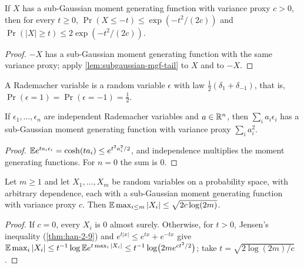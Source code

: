 \begin{lemma}
  \label{lem:subgaussian-mgf-two-sided}
  If $X$ has a sub-Gaussian moment generating function with variance proxy $c>0$, then for every $t\ge0$, $\Pr(X\le-t)\le\exp(-t^2/(2c))$ and $\Pr(|X|\ge t)\le2\exp(-t^2/(2c))$.
\end{lemma}
\begin{proof}
  $-X$ has a sub-Gaussian moment generating function with the same variance proxy; apply \cref{lem:subgaussian-mgf-tail} to $X$ and to $-X$.
\end{proof}

\begin{definition}
  \label{def:rademacher}
  A Rademacher variable is a random variable $\epsilon$ with law $\frac12(\delta_1+\delta_{-1})$, that is, $\Pr(\epsilon=1)=\Pr(\epsilon=-1)=\frac12$.
\end{definition}

\begin{lemma}
  \label{lem:rademacher-mgf}
  If $\epsilon_1,\dots,\epsilon_n$ are independent Rademacher variables and $a\in\mathbb{R}^n$, then $\sum_ia_i\epsilon_i$ has a sub-Gaussian moment generating function with variance proxy $\sum_ia_i^2$.
\end{lemma}
\begin{proof}
  $\mathbb{E} e^{ta_i\epsilon_i}=\cosh(ta_i)\le e^{t^2a_i^2/2}$, and independence multiplies the moment generating functions. For $n=0$ the sum is $0$.
\end{proof}

\begin{lemma}
  \label{lem:subgaussian-max}
  Let $m\ge1$ and let $X_1,\dots,X_m$ be random variables on a probability space, with arbitrary dependence, each with a sub-Gaussian moment generating function with variance proxy $c$. Then $\mathbb{E}\max_{i\le m}|X_i|\le\sqrt{2c\log(2m)}$.
\end{lemma}
\begin{proof}
  If $c=0$, every $X_i$ is $0$ almost surely. Otherwise, for $t>0$, Jensen's inequality (\cref{thm:han-2-9}) and $e^{t|x|}\le e^{tx}+e^{-tx}$ give $\mathbb{E}\max_i|X_i|\le t^{-1}\log\mathbb{E} e^{t\max_i|X_i|}\le t^{-1}\log\bigl(2me^{ct^2/2}\bigr)$; take $t=\sqrt{2\log(2m)/c}$.
\end{proof}


